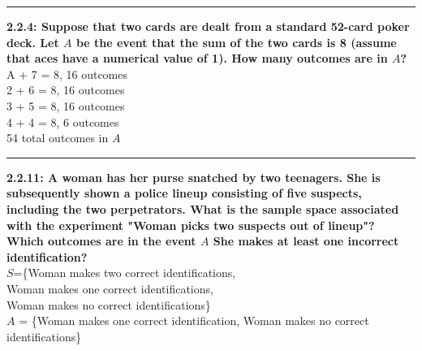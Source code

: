 \documentclass[11pt]{article}
\newcommand\question[2]{\vspace{.25in}\hrule\textbf{#1: #2}}
\begin{document}
\raggedright
\newcommand\NAME{Jonathan Lopez}  %
\newcommand\HWNUM{1}              %


\question{2.2.4}{Suppose that two cards are dealt from a standard 52-card poker
deck. Let $A$ be the event that the sum of the two cards is 8 (assume that aces
have a numerical value of 1). How many outcomes are in $A$?} 
\\ A + 7 = 8, 16 outcomes
\\ 2 + 6 = 8, 16 outcomes
\\ 3 + 5 = 8, 16 outcomes
\\ 4 + 4 = 8, 6 outcomes
\\ 54 total outcomes in $A$


\question{2.2.11}{A woman has her purse snatched by two teenagers. She is 
subsequently shown a police lineup consisting of five suspects, including
the two perpetrators. What is the sample space associated with the experiment
"Woman picks two suspects out of lineup"? Which outcomes are in the event $A$ She makes at least one incorrect identification?}
\\ $S$=\{Woman makes two correct identifications,
\\ Woman makes one correct identifications,
\\ Woman makes no correct identifications\}
\\ $A$ = \{Woman makes one correct identification, Woman makes no correct identifications\}
\end{document}
